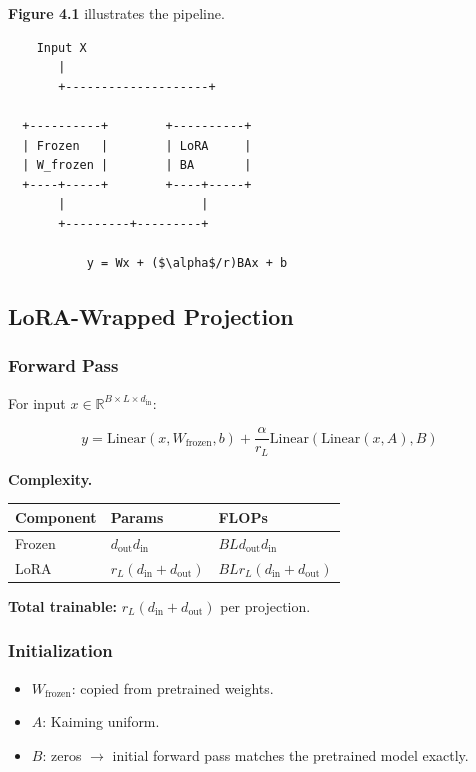 \textbf{Figure 4.1} illustrates the pipeline.

\begin{lstlisting}
    Input X
       |
       +--------------------+
                             
  +----------+        +----------+
  | Frozen   |        | LoRA     |
  | W_frozen |        | BA       |
  +----+-----+        +----+-----+
       |                   |
       +---------+---------+
                  
           y = Wx + ($\alpha$/r)BAx + b
\end{lstlisting}

\subsection{LoRA-Wrapped Projection}

\subsubsection{Forward Pass}

For input $x \in \mathbb{R}^{B \times L \times d_\text{in}}$:

\[
y = \text{Linear}(x, W_\text{frozen}, b) + \frac{\alpha}{r_L} \text{Linear}(\text{Linear}(x, A), B)
\]

\textbf{Complexity.}

\begin{table}[H]
\centering
\small
\begin{tabular}{lll}
\toprule
\textbf{Component} & \textbf{Params} & \textbf{FLOPs} \\
\midrule
Frozen & $d_\text{out} d_\text{in}$ & $B L d_\text{out} d_\text{in}$ \\
LoRA & $r_L (d_\text{in} + d_\text{out})$ & $B L r_L (d_\text{in} + d_\text{out})$ \\
\bottomrule
\end{tabular}
\end{table}

\textbf{Total trainable:} $r_L (d_\text{in} + d_\text{out})$ per projection.

\subsubsection{Initialization}

\begin{itemize}
\item $W_\text{frozen}$: copied from pretrained weights.
\item $A$: Kaiming uniform.
\item $B$: zeros $\to$ initial forward pass matches the pretrained model exactly.

\end{itemize}
